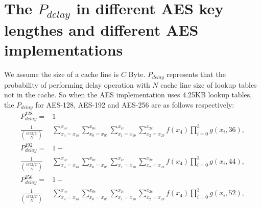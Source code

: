 \section{The $P_{delay}$ in different AES key lengthes and different AES implementations }
\label{appendixb}
We assume the size of a cache line is $C$ Byte. $P_{delay}$ represents that the probability of performing delay operation with $N$ cache line size of lookup tables not in the cache. So when the AES implementation uses 4.25KB lookup tables, the $P_{delay}$ for AES-128, AES-192 and AES-256 are as follows respectively:
\begin{align}
    P_{delay}^{128} = &1-   \nonumber \\
    \frac{1}{\binom{4352/C}{N}}&\sum_{x_4=x_{4b}}^{x_{4e}}{\sum_{x_0=x_{0b}}^{x_{0e}}{\sum_{x_1=x_{1b}}^{x_{1e}}{ \sum_{x_2=x_{2b}}^{x_{2e}}{f(x_4)\prod_{i=0}^{3}{g(x_i,36)}}}}},
\end{align}
\begin{align}
    P_{delay}^{192} = &1-  \nonumber \\
    \frac{1}{\binom{4352/C}{N}}&\sum_{x_4=x_{4b}}^{x_{4e}}{\sum_{x_0=x_{0b}}^{x_{0e}}{\sum_{x_1=x_{1b}}^{x_{1e}}{ \sum_{x_2=x_{2b}}^{x_{2e}}{f(x_4)\prod_{i=0}^{3}{g(x_i,44)}}}}},
\end{align}
\begin{align}
    P_{delay}^{256} = &1-  \nonumber \\
    \frac{1}{\binom{4352/C}{N}}&\sum_{x_4=x_{4b}}^{x_{4e}}{\sum_{x_0=x_{0b}}^{x_{0e}}{\sum_{x_1=x_{1b}}^{x_{1e}}{ \sum_{x_2=x_{2b}}^{x_{2e}}{f(x_4)\prod_{i=0}^{3}{g(x_i,52)}}}}},
\end{align}

